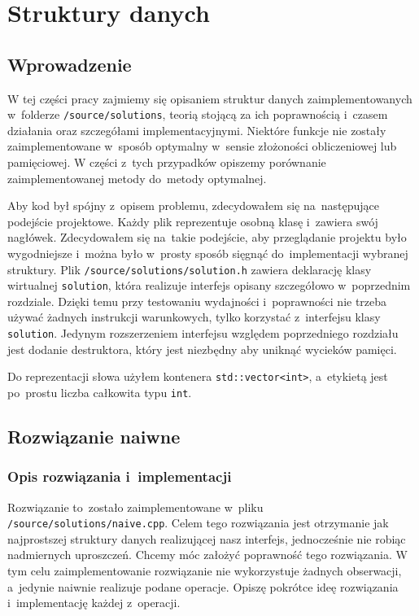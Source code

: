 \documentclass[declaration,shortabstract]{iithesis}
\theoremstyle{definition} \newtheorem{definition}{Definicja}[chapter]
\theoremstyle{plain} \newtheorem{remark}[definition]{Obserwacja}
\theoremstyle{plain} \newtheorem{theorem}[definition]{Twierdzenie}
\theoremstyle{plain} \newtheorem{example}{Przykład}[definition]
\theoremstyle{plain} \newtheorem{lemma}[definition]{Lemat}
\begin{document}
\chapter{Struktury danych}

\section{Wprowadzenie}

W tej części pracy zajmiemy się opisaniem struktur danych zaimplementowanych w~folderze \texttt{/source/solutions}, teorią stojącą za ich poprawnością i~czasem działania oraz szczegółami implementacyjnymi. Niektóre funkcje nie zostały zaimplementowane w~sposób optymalny w~sensie złożoności obliczeniowej lub pamięciowej. W części z~tych przypadków opiszemy porównanie zaimplementowanej metody do~metody optymalnej.

Aby kod był spójny z~opisem problemu, zdecydowałem się na~następujące podejście projektowe. Każdy plik reprezentuje osobną klasę i~zawiera swój nagłówek. Zdecydowałem się na~takie podejście, aby przeglądanie projektu było wygodniejsze i~można było w~prosty sposób sięgnąć do~implementacji wybranej struktury. Plik \texttt{/source/solutions/solution.h} zawiera deklarację klasy wirtualnej \texttt{solution}, która realizuje interfejs opisany szczegółowo w~poprzednim rozdziale. Dzięki temu przy testowaniu wydajności i~poprawności nie trzeba używać żadnych instrukcji warunkowych, tylko korzystać z~interfejsu klasy \texttt{solution}. Jedynym rozszerzeniem interfejsu względem poprzedniego rozdziału jest dodanie destruktora, który jest niezbędny aby uniknąć wycieków pamięci.

Do reprezentacji słowa użyłem kontenera \texttt{std::vector<int>}, a~etykietą jest po~prostu liczba całkowita typu \texttt{int}.

\section{Rozwiązanie naiwne}

\subsection{Opis rozwiązania i~implementacji}

Rozwiązanie to~zostało zaimplementowane w~pliku \texttt{/source/solutions/naive.cpp}. Celem tego rozwiązania jest otrzymanie jak najprostszej struktury danych realizującej nasz interfejs, jednocześnie nie robiąc nadmiernych uproszczeń. Chcemy móc założyć poprawność tego rozwiązania. W tym celu zaimplementowanie rozwiązanie nie wykorzystuje żadnych obserwacji, a~jedynie naiwnie realizuje podane operacje. Opiszę pokrótce ideę rozwiązania i~implementację każdej z~operacji.
\end{document}
